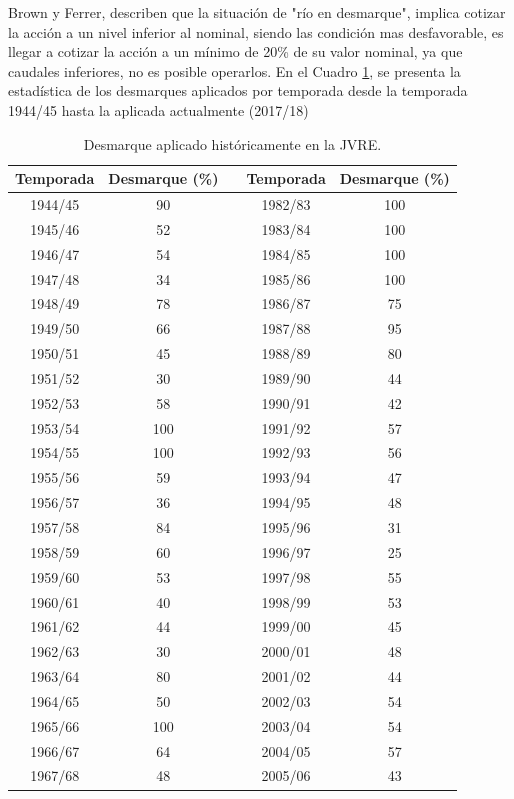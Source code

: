 \documentclass[11pt,]{article}
\begin{document}
	Brown y Ferrer, describen que la situación de "río en desmarque", implica cotizar la acción a un nivel inferior al nominal, siendo las condición mas desfavorable, es llegar a cotizar la acción a un mínimo de 20\% de su valor nominal, ya que caudales inferiores, no es posible operarlos. En el Cuadro \ref{my-label1}, se presenta la estadística de los desmarques aplicados por temporada desde la temporada 1944/45 hasta la aplicada actualmente (2017/18) \bigskip

\begin{table}[H]
\centering
\caption{Desmarque aplicado históricamente en la JVRE.}
\label{my-label1}
\begin{tabular}{@{}ccccc@{}}
\toprule
\textbf{Temporada} & \textbf{Desmarque (\%)} & \textbf{} & \textbf{Temporada} & \textbf{Desmarque (\%)} \\ \midrule
1944/45 & 90 &  & 1982/83 & 100 \\
1945/46 & 52 &  & 1983/84 & 100 \\
1946/47 & 54 &  & 1984/85 & 100 \\
1947/48 & 34 &  & 1985/86 & 100 \\
1948/49 & 78 &  & 1986/87 & 75 \\
1949/50 & 66 &  & 1987/88 & 95 \\
1950/51 & 45 &  & 1988/89 & 80 \\
1951/52 & 30 &  & 1989/90 & 44 \\
1952/53 & 58 &  & 1990/91 & 42 \\
1953/54 & 100 &  & 1991/92 & 57 \\
1954/55 & 100 &  & 1992/93 & 56 \\
1955/56 & 59 &  & 1993/94 & 47 \\
1956/57 & 36 &  & 1994/95 & 48 \\
1957/58 & 84 &  & 1995/96 & 31 \\
1958/59 & 60 &  & 1996/97 & 25 \\
1959/60 & 53 &  & 1997/98 & 55 \\
1960/61 & 40 &  & 1998/99 & 53 \\
1961/62 & 44 &  & 1999/00 & 45 \\
1962/63 & 30 &  & 2000/01 & 48 \\
1963/64 & 80 &  & 2001/02 & 44 \\
1964/65 & 50 &  & 2002/03 & 54 \\
1965/66 & 100 &  & 2003/04 & 54 \\
1966/67 & 64 &  & 2004/05 & 57 \\
1967/68 & 48 &  & 2005/06 & 43 \\

\end{tabular}
\end{table}
\end{document}

